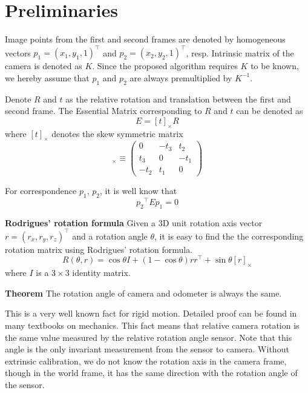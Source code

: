 \documentclass[letterpaper, 10 pt, conference]{ieeeconf}
\begin{document}
\section{Preliminaries}
\label{Preliminaries}

Image points from the first and second frames are denoted by homogeneous vectors $p_1 = (x_1, y_1, 1)^\top$ and $p_2 = (x_2, y_2, 1)^\top$, resp. Intrinsic matrix of the camera is denoted as $K$. Since the proposed algorithm requires $K$ to be known, we hereby assume that $p_1$ and $p_2$ are always premultiplied by $K^{-1}$. 

Denote $R$ and $t$ as the relative rotation and translation between the first and second frame. The Essential Matrix corresponding to $R$ and $t$ can be denoted as 
\begin{equation}
\label{EssentialDecomposition}
E = [t]_\times R
\end{equation}
where $[t]_\times$ denotes the skew symmetric matrix
\begin{equation}
[t]_\times \equiv \left(
	\begin{array}{clr}
		0 & -t_3 & t_2 \\
		t_3 & 0 & -t_1 \\
		-t_2 & t_1 & 0
	\end{array}
\right)	
\end{equation}

For correspondence $p_1$, $p_2$, it is well know that
\begin{equation}
\label{EpipolarConstraints}
{p_2}^\top E p_1 = 0
\end{equation}

\textbf{Rodrigues' rotation formula} 
Given a 3D unit rotation axis vector $r = (r_x, r_y, r_z)^\top$ and a rotation angle $\theta$, it is easy to find the the corresponding rotation matrix using Rodrigues' rotation formula. 
\begin{equation}
\label{Rodrigues}
R(\theta, r) = \cos \theta I + (1 - \cos \theta) r r^\top + \sin \theta [ r ]_\times
\end{equation}
where $I$ is a $3 \times 3$ identity matrix. 

\textbf{Theorem}
The rotation angle of camera and odometer is always the same. 

This is a very well known fact for rigid motion. Detailed proof can be found in many textbooks on mechanics. This fact means that relative camera rotation is the same value measured by the relative rotation angle sensor. Note that this angle is the only invariant measurement from the sensor to camera. Without extrinsic calibration, we do not know the rotation axis in the camera frame, though in the world frame, it has the same direction with the rotation angle of the sensor. 
\end{document}
